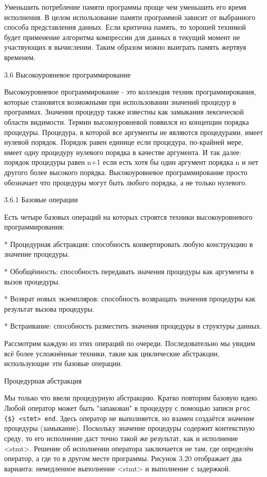 Уменьшить потребление памяти программы проще чем уменьшить его время исполнения. В целом использование памяти программой зависит от выбранного способа представления данных. Если критична память, то хорошей техникой будет применение алгоритма компрессии для данных в текущий момент не участвующих в вычислении. Таким образом можно выиграть память жертвуя временем.

3.6 Высокоуровневое программирование

Высокоуровневое программирование - это коллекция техник программирования, которые становятся возможными при использовании значений процедур в программах. Значения процедур также известны как замыкания лексической области видимости. Термин высокоуровневой появился из концепции порядка процедуры. Процедура, в которой все аргументы не являются процедурами, имеет нулевой порядок. Порядок равен единице если процедура, по-крайней мере, имеет одну процедуру нулевого порядка в качестве аргумента. И так далее: порядок процедуры равен n+1 если есть хотя бы один аргумент порядка n и нет другого более высокого порядка. Высокоуровневое программирование просто обозначает что процедуры могут быть любого порядка, а не только нулевого.

3.6.1 Базовые операции

Есть четыре базовых операций на которых строятся техники высокоуровневого программирования:

* Процедурная абстракция: способность конвертировать любую конструкцию в значение процедуры.

* Обобщённость: способность передавать значения процедуры как аргументы в вызов процедуры.

* Возврат новых экземпляров: способность возвращать значения процедуры как результат вызова процедуры.

* Встраивание: способность разместить значения процедуры в структуры данных.

Рассмотрим каждую из этих операций по очереди. Последовательно мы увидим всё более усложнённые техники, такие как циклические абстракции, использующие эти базовые операции.

Процедурная абстракция

Мы только что ввели процедурную абстракцию. Кратко повторим базовую идею. Любой оператор может быть "запакован" в процедуру с помощью записи \verb!proc {$} <stmt> end!. Здесь оператор не выполняется, но взамен создаётся значение процедуры (замыкание). Поскольку значение процедуры содержит контекстную среду, то его исполнение даст точно такой же результат, как и исполнение <stmt>. Решение об исполнении оператора заключается не там, где определён оператор, а где то в другом месте программы. Рисунок 3.20 отображает два варианта: немедленное выполнение <stmt> и выполнение с задержкой.

